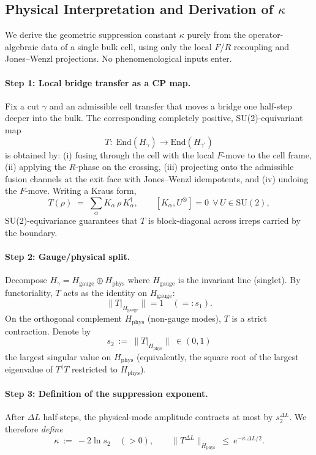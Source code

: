 \documentclass[11pt]{article}
\newcommand{\End}{\mathrm{End}}
\theoremstyle{plain}
\theoremstyle{definition}
\begin{document}
\subsection{Physical Interpretation and Derivation of $\kappa$}
\label{sec:kappa-phys}

We derive the geometric suppression constant $\kappa$ purely from the operator-algebraic data of a single bulk cell, using only the local $F$/$R$ recoupling and Jones--Wenzl projections. No phenomenological inputs enter.

\paragraph{Step 1: Local bridge transfer as a CP map.}
Fix a cut $\gamma$ and an admissible cell transfer that moves a bridge one half-step deeper into the bulk. The corresponding completely positive, SU(2)-equivariant map
\[
  T: \; \End(H_\gamma) \to \End(H_{\gamma'})
\]
is obtained by: (i) fusing through the cell with the local $F$-move to the cell frame, (ii) applying the $R$-phase on the crossing, (iii) projecting onto the admissible fusion channels at the exit face with Jones--Wenzl idempotents, and (iv) undoing the $F$-move. Writing a Kraus form,
\[
  T(\rho)\;=\;\sum_{\alpha} K_\alpha \,\rho\, K_\alpha^\dagger,
  \qquad [K_\alpha, U^{\otimes}] = 0 \ \ \forall\,U\in \mathrm{SU}(2),
\]
SU(2)-equivariance guarantees that $T$ is block-diagonal across irreps carried by the boundary.

\paragraph{Step 2: Gauge/physical split.}
Decompose $H_\gamma = H_{\mathrm{gauge}} \oplus H_{\mathrm{phys}}$ where $H_{\mathrm{gauge}}$ is the invariant line (singlet). By functoriality, $T$ acts as the identity on $H_{\mathrm{gauge}}$:
\[
  \|T|_{H_{\mathrm{gauge}}}\| = 1 \quad (=:s_1).
\]
On the orthogonal complement $H_{\mathrm{phys}}$ (non-gauge modes), $T$ is a strict contraction. Denote by
\[
  s_2 \ :=\ \|T|_{H_{\mathrm{phys}}}\| \ \in (0,1)
\]
the largest singular value on $H_{\mathrm{phys}}$ (equivalently, the square root of the largest eigenvalue of $T^\dagger T$ restricted to $H_{\mathrm{phys}}$).

\paragraph{Step 3: Definition of the suppression exponent.}
After $\Delta L$ half-steps, the physical-mode amplitude contracts at most by $s_2^{\Delta L}$. We therefore \emph{define}
\begin{equation}
  \kappa \ :=\ -2\ln s_2 \quad (>0),
  \qquad
  \|T^{\Delta L}\|_{H_{\mathrm{phys}}} \ \le\ e^{-\kappa\,\Delta L/2}.
  \label{eq:kappa-definition}
\end{equation}
\end{document}

